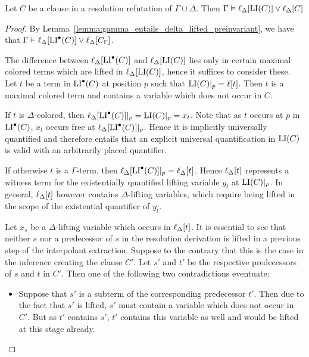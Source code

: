 \documentclass[,%
	draft=false,%
	numbers=noendperiod
	11pt,
	a4paper,
	oneside,%
	openany,
]{memoir}
\begin{document}
\begin{lemma}
	\label{lemma:gamma_entails_delta_lifted_invariant}
	Let $C$ be a clause in a resolution refutation of $\Gamma \cup \Delta$.
	Then
	$\Gamma \vDash \ell_{\Delta}[ \operatorname{LI}(C) ] \lor \ell_{\Delta}[C] $
\end{lemma}
\begin{proof}
	By Lemma~\ref{lemma:gamma_entails_delta_lifted_preinvariant}, we have that 
	$\Gamma \vDash \ell_{\Delta}[\operatorname{LI}^\bullet(C)] \lor \ell_{\Delta}[C_\Gamma]$.

	The difference between $\ell_{\Delta}[\operatorname{LI}^\bullet(C)]$ and $\ell_{\Delta}[\operatorname{LI}(C)]$ lies only in certain maximal colored terms which are lifted in $\ell_{\Delta}[\operatorname{LI}(C)]$, hence it suffices to consider these.
	Let $t$ be a term in $\operatorname{LI}^\bullet(C)$ at position $p$ such that $\operatorname{LI}(C)|_{p} = \ell[t]$.
	Then $t$ is a maximal colored term and contains a variable which does not occur in\nolinebreak{} $C$.

	If $t$ is $\Delta$-colored, then $\ell_{\Delta}[\operatorname{LI}^\bullet(C)]|_{p} = \operatorname{LI}(C)|_{p} = x_t$.
	Note that as $t$ occurs at $p$ in $\operatorname{LI}^\bullet(C)$, $x_t$ occurs free at $\ell_{\Delta}[\operatorname{LI}^\bullet(C)]|_{p}$.
	Hence it is implicitly universally quantified and therefore entails that an explicit universal quantification in $\operatorname{LI}(C)$ is valid with an arbitrarily placed quantifier.  

	If otherwise $t$ is a $\Gamma$-term, then $\ell_{\Delta}[\operatorname{LI}^\bullet(C)]|_{p} = \ell_{\Delta}[t]$.
	Hence $\ell_{\Delta}[t]$ represents a witness term for the existentially quantified lifting variable $y_t$ at $\operatorname{LI}(C)|_{p}$.
	In general, $\ell_{\Delta}[t]$ however contains $\Delta$-lifting variables, which require being lifted in the scope of the existential quantifier of $y_t$. 

	Let $x_s$ be a $\Delta$-lifting variable which occurs in $\ell_{\Delta}[t]$. 
	It is essential to see that neither $s$ nor a predecessor of $s$ in the resolution derivation is lifted in a previous step of the interpolant extraction.
	Suppose to the contrary that this is the case in the inference creating the clause $C'$.
	Let $s'$ and $t'$ be the respective predecessors of $s$ and $t$ in $C'$.
	Then one of the following two contradictions eventuate:
	\begin{itemize}
		\item Suppose that $s'$ is a subterm of the corresponding predecessor $t'$.
			Then due to the fact that $s'$ is lifted, $s'$ must contain a variable which does not occur in $C'$. But as $t'$ contains $s'$, $t'$ contains this variable as well and would be lifted at this stage already.


\end{itemize}
\end{proof}
\end{document}
